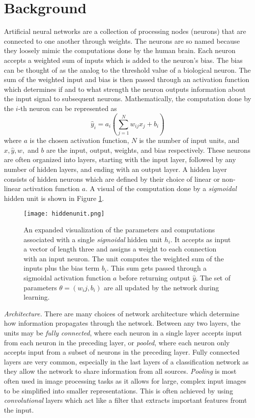 \documentclass[12pt]{article}
\begin{document}
\section{Background}
\indent Artificial neural networks are a collection of processing nodes (neurons) that are connected to one another through weights. The neurons are so named because they loosely mimic the computations done by the human brain. Each neuron accepts a weighted sum of inputs which is added to the neuron's bias. The bias can be thought of as the analog to the threshold value of a biological neuron. The sum of the weighted input and bias is then passed through an activation function which determines if and to what strength the neuron outputs information about the input signal to subsequent neurons. Mathematically, the computation done by the $i$-th neuron can be represented as
\begin{equation}
  \hat y_i = a_i(\sum_{j=1}^N w_{ij}x_j + b_i)
  \label{eq:unit}
\end{equation}
where $a$ is the chosen activation function, $N$ is the number of input units, and $x,\hat y,w,$ and $b$ are the input, output, weights, and bias respectively. These neurons are often organized into layers, starting with the input layer, followed by any number of hidden layers, and ending with an output layer. A hidden layer consists of hidden neurons which are defined by their choice of linear or non-linear activation function $a$. A visual of the computation done by a \textit{sigmoidal} hidden unit is shown in Figure \ref{fig:hiddenunit}.  \\
\begin{figure}[ht]
  \centering
  \texttt{[image: hiddenunit.png]}
  \caption{An expanded visualization of the parameters and computations associated with a single \textit{sigmoidal} hidden unit $h_i$. It accepts as input a vector of length three and assigns a weight to each connection with an input neuron. The unit computes the weighted sum of the inputs plus the bias term $b_i$. This sum gets passed through a sigmoidal activation function $a$ before returning output $\hat{y}$. The set of parameters $\theta = (w_ij,b_i)$ are all updated by the network during learning.}
  \label{fig:hiddenunit}
\end{figure}
\indent \textit{Architecture.} There are many choices of network architecture which determine how information propagates through the network. Between any two layers, the units may be \textit{fully connected}, where each neuron in a single layer accepts input from each neuron in the preceding layer, or \textit{pooled}, where each neuron only accepts input from a subset of neurons in the preceding layer. Fully connected layers are very common, especially in the last layers of a classification network as they allow the network to share information from all sources. \textit{Pooling} is most often used in image processing tasks as it allows for large, complex input images to be simplified into smaller representations. This is often achieved by using \textit{convolutional} layers which act like a filter that extracts important features fromt the input. \\
\end{document}
